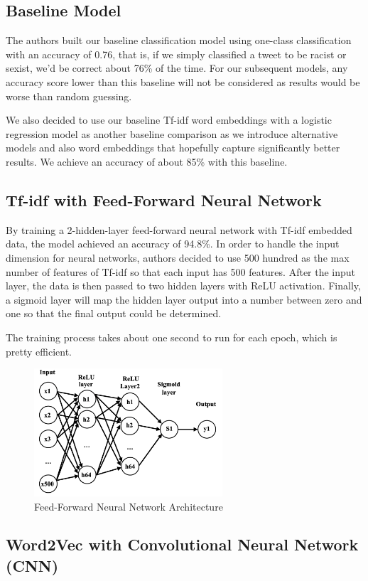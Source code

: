 \documentclass[conference]{IEEEtran}
\begin{document}
\subsection{Baseline Model}
The authors built our baseline classification model using one-class classification with an accuracy of 0.76, that is, if we simply classified a tweet to be racist or sexist, we’d be correct about 76\% of the time. For our subsequent models, any accuracy score lower than this baseline will not be considered as results would be worse than random guessing.

	We also decided to use our baseline Tf-idf word embeddings with a logistic regression model as another baseline comparison as we introduce alternative models and also word embeddings that hopefully capture significantly better results. We achieve an accuracy of about 85\% with this baseline.


\subsection{Tf-idf with Feed-Forward Neural Network}
By training a 2-hidden-layer feed-forward neural network with Tf-idf embedded data, the model achieved an accuracy of 94.8\%. In order to handle the input dimension for neural networks, authors decided to use 500 hundred as the max number of features of Tf-idf so that each input has 500 features. After the input layer, the data is then passed to two hidden layers with ReLU activation. Finally, a sigmoid layer will map the hidden layer output into a number between zero and one so that the final output could be determined.

The training process takes about one second to run for each epoch, which is pretty efficient.

\begin{figure}[htbp]
\centerline{\includegraphics[width=70mm]{fig1.png}}
\caption{Feed-Forward Neural Network Architecture}
\label{fig}
\end{figure}

\subsection{Word2Vec with Convolutional Neural Network (CNN)}
\end{document}
